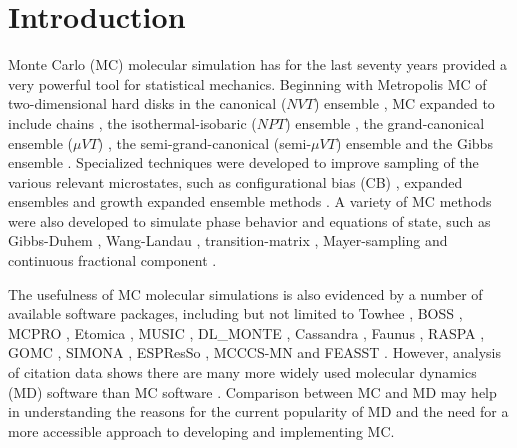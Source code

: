 
\section{\label{sec:intro}Introduction}

Monte Carlo (MC) molecular simulation has for the last seventy years provided a very powerful tool for statistical mechanics.
Beginning with Metropolis MC of two-dimensional hard disks in the canonical ($NVT$) ensemble \cite{metropolis_equation_1953, rosenbluth_further_1954}, MC expanded to include chains \cite{rosenbluth_monte_1955}, the isothermal-isobaric ($NPT$) ensemble \cite{wood_monte_1968}, the grand-canonical ensemble ($\mu VT$) \cite{norman_investigation_1969, adams_grand_1975}, the semi-grand-canonical (semi-$\mu VT$) ensemble \cite{kofke_monte_1988} and the Gibbs ensemble \cite{panagiotopoulos_direct_1987}.
Specialized techniques were developed to improve sampling of the various relevant microstates, such as configurational bias (CB) \cite{rosenbluth_monte_1955, siepmann_configurational_1992}, expanded ensembles \cite{lyubartsev_new_1992} and growth expanded ensemble methods \cite{escobedo_expanded_1996}.
A variety of MC methods were also developed to simulate phase behavior and equations of state, such as Gibbs-Duhem \cite{kofke_gibbs-duhem_1993}, Wang-Landau \cite{wang_efficient_2001}, transition-matrix \cite{fitzgerald_canonical_1999, errington_direct_2005}, Mayer-sampling \cite{singh_mayer_2004} and continuous fractional component \cite{shi_continuous_2007}.

The usefulness of MC molecular simulations is also evidenced by a number of available software packages, including but not limited to Towhee \cite{martin_MCCCS_2013}, BOSS \cite{jorgensen_molecular_2005}, MCPRO \cite{jorgensen_molecular_2005}, Etomica \cite{schultz_etomica_2015}, MUSIC \cite{gupta_object-oriented_2003}, DL\_MONTE \cite{brukhno_dl_monte_2021}, Cassandra \cite{shah_cassandra_2017}, Faunus \cite{lund_faunus_2008}, RASPA \cite{dubbeldam_raspa_2016}, GOMC \cite{nejahi_gomc_2019}, SIMONA \cite{penaloza-amion_monte-carlo_2021}, ESPResSo \cite{limbach_espressoextensible_2006}, MCCCS-MN \cite{sun_deep_2019} and FEASST \cite{hatch_monte_2024}.
However, analysis of citation data shows there are many more widely used molecular dynamics (MD) \cite{alder_phase_1957} software than MC software \cite{talirz_trends_2021}.
Comparison between MC and MD may help in understanding the reasons for the current popularity of MD and the need for a more accessible approach to developing and implementing MC.

